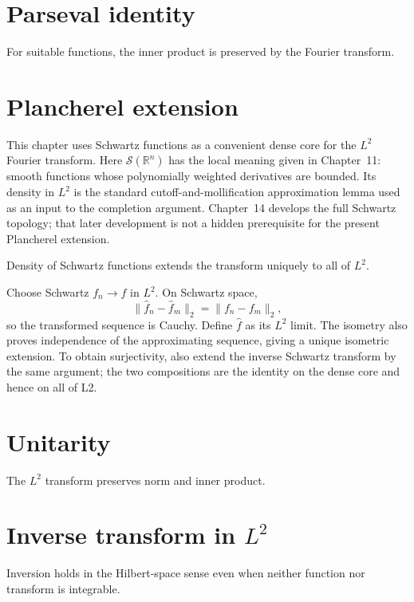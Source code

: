 \section{Parseval identity}
For suitable functions, the inner product is preserved by the Fourier transform.

\section{Plancherel extension}
\begin{remark}
This chapter uses Schwartz functions as a convenient dense core for the
$L^2$ Fourier transform.  Here $\mathcal S(\mathbb R^n)$ has the local meaning
given in Chapter~11: smooth functions whose polynomially weighted derivatives
are bounded.  Its density in $L^2$ is the standard cutoff-and-mollification
approximation lemma used as an input to the completion argument.  Chapter~14
develops the full Schwartz topology; that later development is not a hidden
prerequisite for the present Plancherel extension.
\end{remark}
Density of Schwartz functions extends the transform uniquely to all of $L^2$.


\begin{example}\label{ex:iii13-expand-01}
Choose Schwartz \(f_n\to f\) in \(L^2\). On Schwartz space,
\[
\|\widehat f_n-\widehat f_m\|_2=\|f_n-f_m\|_2,
\]
so the transformed sequence is Cauchy. Define \(\widehat f\) as its \(L^2\)
limit. The isometry also proves independence of the approximating sequence,
giving a unique isometric extension. To obtain surjectivity, also extend the inverse Schwartz transform by the same argument; the two compositions are the identity on the dense core and hence on all of L2.
\end{example}
\section{Unitarity}
The $L^2$ transform preserves norm and inner product.

\section{Inverse transform in $L^2$}
Inversion holds in the Hilbert-space sense even when neither function nor transform is integrable.

